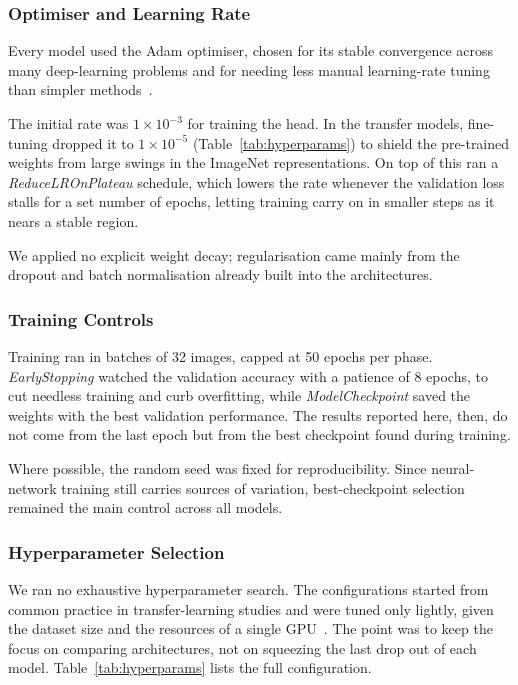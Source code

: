 \documentclass[preprint,12pt]{elsarticle}
\begin{document}
\subsubsection{Optimiser and Learning Rate}

Every model used the Adam optimiser, chosen for its stable convergence across many deep-learning problems and for needing less manual learning-rate tuning than simpler methods~\cite{kingma2015adam}.

The initial rate was $1\times10^{-3}$ for training the head. In the transfer models, fine-tuning dropped it to $1\times10^{-5}$ (Table~\ref{tab:hyperparams}) to shield the pre-trained weights from large swings in the ImageNet representations. On top of this ran a \textit{ReduceLROnPlateau} schedule, which lowers the rate whenever the validation loss stalls for a set number of epochs, letting training carry on in smaller steps as it nears a stable region.

We applied no explicit weight decay; regularisation came mainly from the dropout and batch normalisation already built into the architectures.

\subsubsection{Training Controls}

Training ran in batches of 32 images, capped at 50 epochs per phase. \textit{EarlyStopping} watched the validation accuracy with a patience of 8 epochs, to cut needless training and curb overfitting, while \textit{ModelCheckpoint} saved the weights with the best validation performance. The results reported here, then, do not come from the last epoch but from the best checkpoint found during training.

Where possible, the random seed was fixed for reproducibility. Since neural-network training still carries sources of variation, best-checkpoint selection remained the main control across all models.

\subsubsection{Hyperparameter Selection}

We ran no exhaustive hyperparameter search. The configurations started from common practice in transfer-learning studies and were tuned only lightly, given the dataset size and the resources of a single GPU~\cite{martins2025mobilenet}. The point was to keep the focus on comparing architectures, not on squeezing the last drop out of each model. Table~\ref{tab:hyperparams} lists the full configuration.
\end{document}
